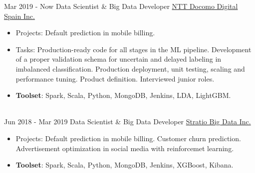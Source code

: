 \documentclass[letterpaper]{twentysecondcv} %
\begin{document}
\begin{twenty} %

\twentyitem
    	{Mar 2019 - }
		{Now}
        {Data Scientist \& Big Data Developer}
        {\href{https://www.docomodigital.com/}{NTT Docomo Digital Spain Inc.}}
        {}
        {\begin{itemize}
        \item Projects: Default prediction in mobile billing. 
        \item Tasks: Production-ready code for all stages in the ML pipeline. Development of a proper validation schema for uncertain and delayed labeling in imbalanced classification. Production deployment, unit testing, scaling and performance tuning. Product definition. Interviewed junior roles.
        \item \textbf{Toolset}: Spark, Scala, Python, MongoDB, Jenkins, LDA, LightGBM.
        \end{itemize}}
        \\
\twentyitem
    	{Jun 2018 -}
		{Mar 2019}
        {Data Scientist \& Big Data Developer}
        {\href{http://www.stratio.com/}{Stratio Big Data Inc.}}
        {}
        {\begin{itemize}
        \item Projects: Default prediction in mobile billing. Customer churn prediction. Advertisement optimization in social media with reinforcemet learning. 
        \item \textbf{Toolset}: Spark, Scala, Python, MongoDB, Jenkins, XGBoost, Kibana. 
        \end{itemize}}
        \\     %

        

\end{twenty}
\end{document}
